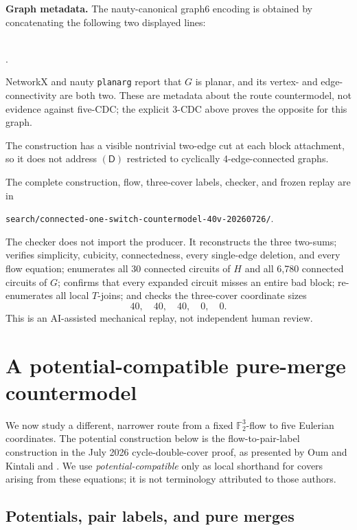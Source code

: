 \documentclass[11pt]{article}
\theoremstyle{definition}
\theoremstyle{remark}
\newcommand{\F}{\mathbb F}
\begin{document}
\medskip
\noindent
\textbf{Graph metadata.}
The nauty-canonical graph6 encoding is obtained by concatenating the
following two displayed lines:
\begin{center}
\small
\texttt{}\\
\texttt{}.
\end{center}
NetworkX and nauty \texttt{planarg} report that \(G\) is planar, and its
vertex- and edge-connectivity are both two.  These are metadata about the
route countermodel, not evidence against five-CDC; the explicit 3-CDC
above proves the opposite for this graph.

The construction has a visible nontrivial two-edge cut at each block
attachment, so it does not address \((\mathsf D)\) restricted to
cyclically 4-edge-connected graphs.

The complete construction, flow, three-cover labels, checker, and frozen
replay are in
\begin{center}
\texttt{search/connected-one-switch-countermodel-40v-20260726/}.
\end{center}
The checker does not import the producer.  It reconstructs the three
two-sums; verifies simplicity, cubicity, connectedness, every single-edge
deletion, and every flow equation; enumerates all 30 connected circuits
of \(H\) and all 6,780 connected circuits of \(G\); confirms that every
expanded circuit misses an entire bad block; re-enumerates all local
\(T\)-joins; and checks the three-cover coordinate sizes
\[
 40,\quad40,\quad40,\quad0,\quad0.
\]
This is an AI-assisted mechanical replay, not independent human review.

\section{A potential-compatible pure-merge countermodel}
\label{sec:puremerge}

We now study a different, narrower route from a fixed
\(\F_2^3\)-flow to five Eulerian coordinates.  The potential construction
below is the flow-to-pair-label construction in the July 2026
cycle-double-cover proof, as presented by Oum and Kintali
\cite[Section~5]{oum2026} and \cite{kintali2026}.  We use
\emph{potential-compatible} only as local shorthand for covers arising
from these equations; it is not terminology attributed to those authors.

\subsection{Potentials, pair labels, and pure merges}
\end{document}
